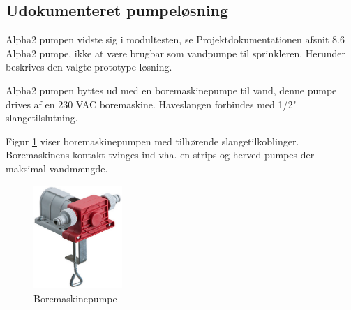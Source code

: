 
\subsection{Udokumenteret pumpeløsning}

Alpha2 pumpen vidste sig i modultesten, se Projektdokumentationen afsnit 8.6 Alpha2 pumpe, ikke at være brugbar som vandpumpe til sprinkleren. Herunder beskrives den valgte prototype løsning.

Alpha2 pumpen byttes ud med en boremaskinepumpe til vand, denne pumpe drives af en 230 VAC boremaskine. Haveslangen forbindes med 1/2" slangetilslutning. 

Figur \ref{fig:boremaskinepumpe} viser boremaskinepumpen med tilhørende slangetilkoblinger. Boremaskinens kontakt tvinges ind vha. en strips og herved pumpes der maksimal vandmængde. 

\begin{figure}[h]
  \centering
    \includegraphics[width=0.3\textwidth]{Billeder/boremaskinepumpe}
    \caption{Boremaskinepumpe}
    \label{fig:boremaskinepumpe}
\end{figure}